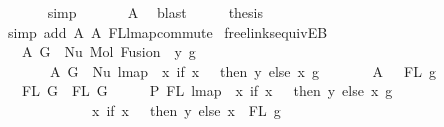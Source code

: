 \begin{isabellebody}
\ \ \ \ \ \isamarkupfalse%
\ simp\isanewline
\ \ \ \ \ \isamarkupfalse%
\ A{}\ \isamarkupfalse%
\ blast\isanewline
\ \ \isamarkupfalse%
\ \isamarkupfalse%
\ {\isacharquery}{\kern0pt}thesis\isanewline
\ \ \ \ \ \isamarkupfalse%
\ {\isacharparenleft}{\kern0pt}simp\ add{\isacharcolon}{\kern0pt}\ A{}\ A{}\ FL{\isacharunderscore}{\kern0pt}lmap{\isacharunderscore}{\kern0pt}commute{\isacharparenright}{\kern0pt}\isanewline
{}\isamarkupfalse%
%
\endisatagproof
{\isafoldproof}%
%
\isadelimproof
\isanewline
%
\endisadelimproof
\isanewline
\isanewline
{}\isamarkupfalse%
\ freelinks{\isacharunderscore}{\kern0pt}equiv{\isacharunderscore}{\kern0pt}E{}B{\isacharcolon}{\kern0pt}\isanewline
\ \ \ A{}{\isacharcolon}{\kern0pt}\ {\isachardoublequoteopen}G{}\ {\isacharequal}{\kern0pt}\ Nu\ {\isacharparenleft}{\kern0pt}Mol\ {\isacharparenleft}{\kern0pt}Fusion\ {}\ y{\isacharparenright}{\kern0pt}\ g{\isacharparenright}{\kern0pt}{\isachardoublequoteclose}\isanewline
\ \ \ \ \ \ \ A{}{\isacharcolon}{\kern0pt}\ {\isachardoublequoteopen}G{}\ {\isacharequal}{\kern0pt}\ Nu\ {\isacharparenleft}{\kern0pt}lmap\ {\isacharparenleft}{\kern0pt}{\isasymlambda}\ x{\isachardot}{\kern0pt}\ if\ x\ {\isacharequal}{\kern0pt}\ {}\ then\ y\ else\ x{\isacharparenright}{\kern0pt}\ g{\isacharparenright}{\kern0pt}{\isachardoublequoteclose}\isanewline
\ \ \ \ \ \ \ A{}{\isacharcolon}{\kern0pt}\ {\isachardoublequoteopen}{}\ {\isasymin}\ FL\ g{\isachardoublequoteclose}\isanewline
\ \ \ {\isachardoublequoteopen}FL\ G{}\ {\isacharequal}{\kern0pt}\ FL\ G{}{\isachardoublequoteclose}\isanewline
%
\isadelimproof
%
\endisadelimproof
%
\isatagproof
{}\isamarkupfalse%
\ {\isacharminus}{\kern0pt}\isanewline
\ \ \isamarkupfalse%
\ P{}{\isacharcolon}{\kern0pt}\ {\isachardoublequoteopen}FL\ {\isacharparenleft}{\kern0pt}lmap\ {\isacharparenleft}{\kern0pt}{\isasymlambda}\ x{\isachardot}{\kern0pt}\ if\ x\ {\isacharequal}{\kern0pt}\ {}\ then\ y\ else\ x{\isacharparenright}{\kern0pt}\ g{\isacharparenright}{\kern0pt}\ {\isacharequal}{\kern0pt}\isanewline
\ \ \ \ \ \ \ \ \ \ \ \ {\isacharparenleft}{\kern0pt}{\isasymlambda}\ x{\isachardot}{\kern0pt}\ if\ x\ {\isacharequal}{\kern0pt}\ {}\ then\ y\ else\ x{\isacharparenright}{\kern0pt}\ {\isacharbackquote}{\kern0pt}\ FL\ g{\isachardoublequoteclose}\isanewline

\end{isabellebody}
